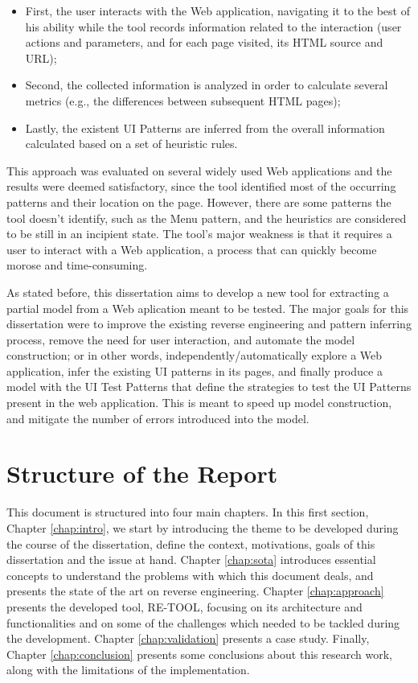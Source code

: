 \begin{itemize}
\item First, the user interacts with the Web application, navigating it to the best of his ability while the tool records information related to the interaction (user actions and parameters, and for each page visited, its HTML source and URL);
\item Second, the collected information is analyzed in order to calculate several metrics (e.g., the differences between subsequent HTML pages);
\item Lastly, the existent UI Patterns are inferred from the overall information calculated based on a set of heuristic rules.
\end{itemize}

This approach was evaluated on several widely used Web applications and the results were deemed satisfactory, since the tool identified most of the occurring patterns and their location on the page. However, there are some patterns the tool doesn't identify, such as the Menu pattern, and the heuristics are considered to be still in an incipient state. The tool's major weakness is that it requires a user to interact with a Web application, a process that can quickly become morose and time-consuming.

As stated before, this dissertation aims to develop a new tool for extracting a partial model from a Web aplication meant to be tested. The major goals for this dissertation were to improve the existing reverse engineering and pattern inferring process, remove the need for user interaction, and automate the model construction; or in other words, independently/automatically explore a Web application, infer the existing UI patterns in its pages, and finally produce a model with the UI Test Patterns that define the strategies to test the UI Patterns present in the web application. This is meant to speed up model construction, and mitigate the number of errors introduced into the model.

\section{Structure of the Report} \label{sec:outline}

This document is structured into four main chapters. In this first section, Chapter \ref{chap:intro}, we start by introducing the theme to be developed during the course of the dissertation, define the context, motivations, goals of this dissertation and the issue at hand. Chapter \ref{chap:sota} introduces essential concepts to understand the problems with which this document deals, and presents the state of the art on reverse engineering. Chapter \ref{chap:approach} presents the developed tool, RE-TOOL, focusing on its architecture and functionalities and on some of the challenges which needed to be tackled during the development. Chapter \ref{chap:validation} presents a case study. Finally, Chapter \ref{chap:conclusion} presents some conclusions about this research work, along with the limitations of the implementation.